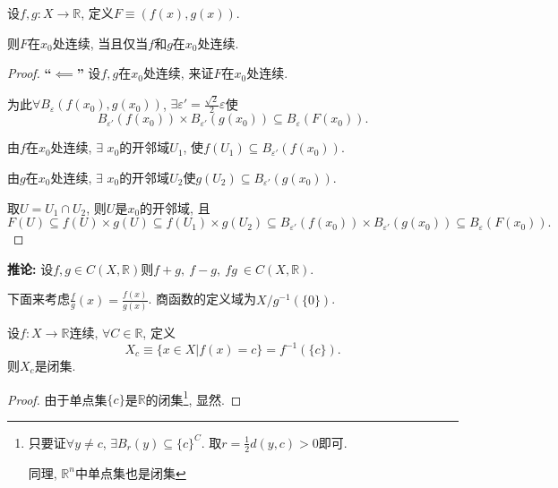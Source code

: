 \begin{proposition}
    设$f,g\colon X \to \mathbb{R}$, 定义$F \equiv \left( f\left( x \right) ,g\left( x \right)  \right) $. 
    
    则$F$在$x_0$处连续, 当且仅当$f$和$g$在$x_0$处连续.
\end{proposition}
\begin{proof}
    \textbf{``$\impliedby$''} 设$f,g$在$x_0$处连续, 来证$F$在$x_0$处连续.

    为此$\forall B_{\varepsilon} \left( f\left( x_0 \right) ,g\left( x_0 \right)  \right) $, $\exists \varepsilon' = \frac{\sqrt{2}}{2}\varepsilon$使
    \begin{equation}
      B_{\varepsilon'} \left( f\left( x_0 \right)  \right) \times  B_{\varepsilon'} \left( g\left( x_0 \right)  \right) \subseteq B_{\varepsilon} \left( F\left( x_0 \right) \right).
    \end{equation}

    由$f$在$x_0$处连续, $\exists $ $x_0$的开邻域$U_1$, 使$f\left( U_1 \right) \subseteq  B_{\varepsilon'} \left( f\left( x_0 \right)  \right) $.

    由$g$在$x_0$处连续, $\exists $ $x_0$的开邻域$U_2$使$g\left( U_2 \right) \subseteq B_{\varepsilon'} \left( g\left( x_0 \right)  \right) $.

    取$U = U_1 \cap  U_2$, 则$U$是$x_0$的开邻域, 且
    \begin{equation}
      F\left( U \right) \subseteq f\left( U \right) \times g\left( U \right)  \subseteq f\left( U_1 \right) \times g\left( U_2 \right) \subseteq B_{\varepsilon'} \left( f\left( x_0 \right)  \right) \times B_{\varepsilon'} \left( g\left( x_0 \right)  \right) \subseteq B_{\varepsilon} \left( F\left( x_0 \right)  \right).
    \end{equation}
\end{proof}

\noindent
\textbf{推论: }设$f,g \in C\left( X, \mathbb{R} \right) $则$f+g,\ f-g,\  fg\ \in C\left( X, \mathbb{R} \right) $.

下面来考虑$\frac{f}{g}\left( x \right)  = \frac{f\left( x \right) }{g\left( x \right) }$. 商函数的定义域为$X / g^{-1} \left( \{ 0 \} \right) $.

\begin{proposition}[连续函数的等高面皆为闭集]
    设$f\colon X\to \mathbb{R}$连续, $\forall C \in \mathbb{R}$, 定义
    \begin{equation}
      X_{c} \equiv \{ x\in X | f\left( x \right)  = c \} = f^{-1} \left( \{ c \}  \right) .
    \end{equation}
    则$X_{c}$是闭集.
\end{proposition}
\begin{proof}
    由于单点集$\{ c \}$是$\mathbb{R}$的闭集\footnote{
        只要证$\forall y\neq c$, $\exists  B_{r}\left( y \right) \subseteq \{ c \}^{C}$. 取$r = \frac{1}{2} d\left( y,c \right) > 0$即可.

        同理, $\mathbb{R}^{n}$中单点集也是闭集
    }, 显然.
\end{proof}

